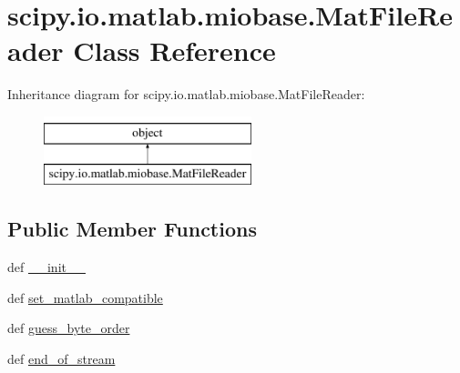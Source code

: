\hypertarget{classscipy_1_1io_1_1matlab_1_1miobase_1_1MatFileReader}{}\section{scipy.\+io.\+matlab.\+miobase.\+Mat\+File\+Reader Class Reference}
\label{classscipy_1_1io_1_1matlab_1_1miobase_1_1MatFileReader}
Inheritance diagram for scipy.\+io.\+matlab.\+miobase.\+Mat\+File\+Reader\+:\begin{figure}[H]
\begin{center}
\leavevmode
\includegraphics[height=2.000000cm]{classscipy_1_1io_1_1matlab_1_1miobase_1_1MatFileReader}
\end{center}
\end{figure}
\subsection*{Public Member Functions}
\begin{DoxyCompactItemize}
\item 
def \hyperlink{classscipy_1_1io_1_1matlab_1_1miobase_1_1MatFileReader_a1610ec454532e7cdcf2cd5a660477db6}{\+\_\+\+\_\+init\+\_\+\+\_\+}
\item 
def \hyperlink{classscipy_1_1io_1_1matlab_1_1miobase_1_1MatFileReader_a2ef59c4615097db3dd4c3545bdf7b231}{set\+\_\+matlab\+\_\+compatible}
\item 
def \hyperlink{classscipy_1_1io_1_1matlab_1_1miobase_1_1MatFileReader_a387304028e2c2765942551459b10cc95}{guess\+\_\+byte\+\_\+order}
\item 
def \hyperlink{classscipy_1_1io_1_1matlab_1_1miobase_1_1MatFileReader_a0806a27c92ce2e2258488c74f6084404}{end\+\_\+of\+\_\+stream}
\end{DoxyCompactItemize}

